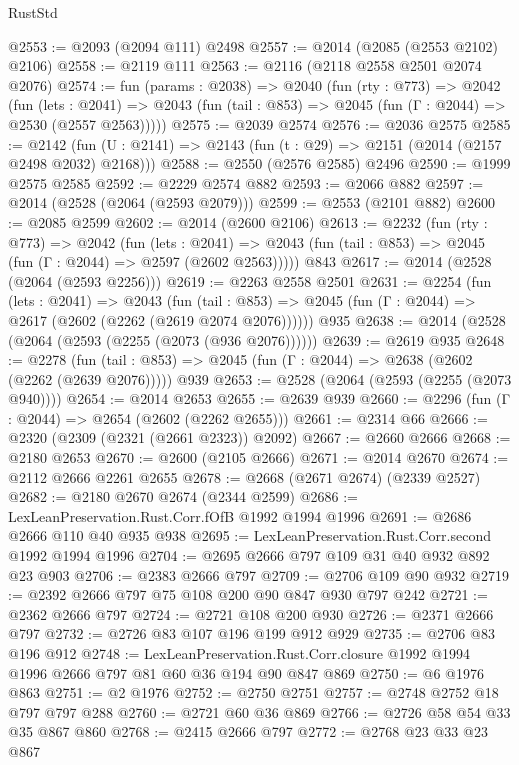 \begin{lexlean}{RustStd}
\begin{coremodule}
@2553 := @2093 (@2094 @111) @2498
@2557 := @2014 (@2085 (@2553 @2102) @2106)
@2558 := @2119 @111
@2563 := @2116 (@2118 @2558 @2501 @2074 @2076)
@2574 := fun (params : @2038) =>
  @2040
    (fun (rty : @773) =>
    @2042
      (fun (lets : @2041) =>
      @2043 (fun (tail : @853) => @2045 (fun (Γ : @2044) => @2530 (@2557 @2563)))))
@2575 := @2039 @2574
@2576 := @2036 @2575
@2585 := @2142 (fun (U : @2141) => @2143 (fun (t : @29) => @2151 (@2014 (@2157 @2498 @2032) @2168)))
@2588 := @2550 (@2576 @2585) @2496
@2590 := @1999 @2575 @2585
@2592 := @2229 @2574 @882
@2593 := @2066 @882
@2597 := @2014 (@2528 (@2064 (@2593 @2079)))
@2599 := @2553 (@2101 @882)
@2600 := @2085 @2599
@2602 := @2014 (@2600 @2106)
@2613 := @2232
    (fun (rty : @773) =>
    @2042
      (fun (lets : @2041) =>
      @2043 (fun (tail : @853) => @2045 (fun (Γ : @2044) => @2597 (@2602 @2563)))))
    @843
@2617 := @2014 (@2528 (@2064 (@2593 @2256)))
@2619 := @2263 @2558 @2501
@2631 := @2254
    (fun (lets : @2041) =>
    @2043
      (fun (tail : @853) => @2045 (fun (Γ : @2044) => @2617 (@2602 (@2262 (@2619 @2074 @2076))))))
    @935
@2638 := @2014 (@2528 (@2064 (@2593 (@2255 (@2073 (@936 @2076))))))
@2639 := @2619 @935
@2648 := @2278
    (fun (tail : @853) => @2045 (fun (Γ : @2044) => @2638 (@2602 (@2262 (@2639 @2076)))))
    @939
@2653 := @2528 (@2064 (@2593 (@2255 (@2073 @940))))
@2654 := @2014 @2653
@2655 := @2639 @939
@2660 := @2296 (fun (Γ : @2044) => @2654 (@2602 (@2262 @2655)))
@2661 := @2314 @66
@2666 := @2320 (@2309 (@2321 (@2661 @2323)) @2092)
@2667 := @2660 @2666
@2668 := @2180 @2653
@2670 := @2600 (@2105 @2666)
@2671 := @2014 @2670
@2674 := @2112 @2666 @2261 @2655
@2678 := @2668 (@2671 @2674) (@2339 @2527)
@2682 := @2180 @2670 @2674 (@2344 @2599)
@2686 := LexLeanPreservation.Rust.Corr.fOfB @1992 @1994 @1996
@2691 := @2686 @2666 @110 @40 @935 @938
@2695 := LexLeanPreservation.Rust.Corr.second @1992 @1994 @1996
@2704 := @2695 @2666 @797 @109 @31 @40 @932 @892 @23 @903
@2706 := @2383 @2666 @797
@2709 := @2706 @109 @90 @932
@2719 := @2392 @2666 @797 @75 @108 @200 @90 @847 @930 @797 @242
@2721 := @2362 @2666 @797
@2724 := @2721 @108 @200 @930
@2726 := @2371 @2666 @797
@2732 := @2726 @83 @107 @196 @199 @912 @929
@2735 := @2706 @83 @196 @912
@2748 := LexLeanPreservation.Rust.Corr.closure
    @1992
    @1994
    @1996
    @2666
    @797
    @81
    @60
    @36
    @194
    @90
    @847
    @869
@2750 := @6 @1976 @863
@2751 := @2 @1976
@2752 := @2750 @2751
@2757 := @2748 @2752 @18 @797 @797 @288
@2760 := @2721 @60 @36 @869
@2766 := @2726 @58 @54 @33 @35 @867 @860
@2768 := @2415 @2666 @797
@2772 := @2768 @23 @33 @23 @867

\end{coremodule}
\end{lexlean}
